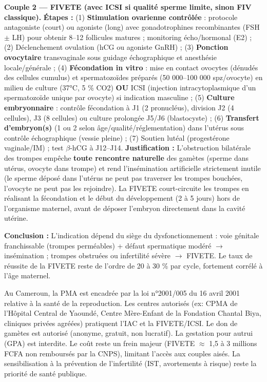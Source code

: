 \documentclass[11pt]{article}
\begin{document}
\begin{exoresolu}
\textbf{Couple 2 — FIVETE (avec ICSI si qualité sperme limite, sinon FIV classique).}
\textbf{Étapes :} (1) \textbf{Stimulation ovarienne contrôlée} : protocole antagoniste (court) ou agoniste (long) avec gonadotrophines recombinantes (FSH $\pm$ LH) pour obtenir 8--12 follicules matures ; monitoring écho/hormonal (E2) ; (2) Déclenchement ovulation (hCG ou agoniste GnRH) ; (3) \textbf{Ponction ovocytaire} transvaginale sous guidage échographique et anesthésie locale/générale ; (4) \textbf{Fécondation in vitro} : mise en contact ovocytes (dénudés des cellules cumulus) et spermatozoïdes préparés (50 000--100 000 spz/ovocyte) en milieu de culture (37°C, 5 \% CO2) \textbf{OU} ICSI (injection intracytoplasmique d'un spermatozoïde unique par ovocyte) si indication masculine ; (5) \textbf{Culture embryonnaire} : contrôle fécondation à J1 (2 pronucléus), division J2 (4 cellules), J3 (8 cellules) ou culture prolongée J5/J6 (blastocyste) ; (6) \textbf{Transfert d'embryon(s)} (1 ou 2 selon âge/qualité/réglementation) dans l'utérus sous contrôle échographique (vessie pleine) ; (7) Soutien lutéal (progestérone vaginale/IM) ; test $\beta$-hCG à J12--J14.
\textbf{Justification :} L'obstruction bilatérale des trompes empêche \textbf{toute rencontre naturelle} des gamètes (sperme dans utérus, ovocyte dans trompe) et rend l'insémination artificielle strictement inutile (le sperme déposé dans l'utérus ne peut pas traverser les trompes bouchées, l'ovocyte ne peut pas les rejoindre). La FIVETE court-circuite les trompes en réalisant la fécondation et le début du développement (2 à 5 jours) hors de l'organisme maternel, avant de déposer l'embryon directement dans la cavité utérine.

\textbf{Conclusion :} L'indication dépend du siège du dysfonctionnement : voie génitale franchissable (trompes perméables) + défaut spermatique modéré $\rightarrow$ insémination ; trompes obstruées ou infertilité sévère $\rightarrow$ FIVETE. Le taux de réussite de la FIVETE reste de l'ordre de 20 à 30 \% par cycle, fortement corrélé à l'âge maternel.
\end{exoresolu}

\begin{savaistu}
Au Cameroun, la PMA est encadrée par la loi n°2001/005 du 16 avril 2001 relative à la santé de la reproduction. Les centres autorisés (ex: CPMA de l'Hôpital Central de Yaoundé, Centre Mère-Enfant de la Fondation Chantal Biya, cliniques privées agréées) pratiquent l'IAC et la FIVETE/ICSI. Le don de gamètes est autorisé (anonyme, gratuit, non lucratif). La gestation pour autrui (GPA) est interdite. Le coût reste un frein majeur (FIVETE $\approx$ 1,5 à 3 millions FCFA non remboursés par la CNPS), limitant l'accès aux couples aisés. La sensibilisation à la prévention de l'infertilité (IST, avortements à risque) reste la priorité de santé publique.
\end{savaistu}
\end{document}
